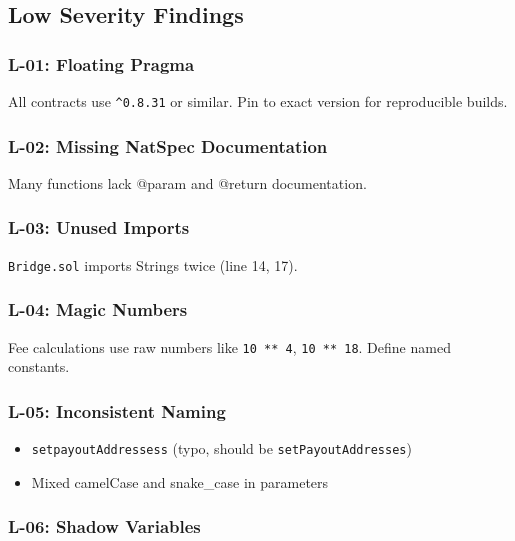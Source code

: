 \documentclass[
]{article}
\providecommand{\tightlist}{%
  \setlength{\itemsep}{0pt}\setlength{\parskip}{0pt}}
\begin{document}
\subsection{Low Severity Findings}\label{low-severity-findings}

\subsubsection{L-01: Floating Pragma}\label{l-01-floating-pragma}

All contracts use \texttt{\^{}0.8.31} or similar. Pin to exact version
for reproducible builds.

\subsubsection{L-02: Missing NatSpec
Documentation}\label{l-02-missing-natspec-documentation}

Many functions lack @param and @return documentation.

\subsubsection{L-03: Unused Imports}\label{l-03-unused-imports}

\texttt{Bridge.sol} imports Strings twice (line 14, 17).

\subsubsection{L-04: Magic Numbers}\label{l-04-magic-numbers}

Fee calculations use raw numbers like \texttt{10\ **\ 4},
\texttt{10\ **\ 18}. Define named constants.

\subsubsection{L-05: Inconsistent
Naming}\label{l-05-inconsistent-naming}

\begin{itemize}
\tightlist
\item
  \texttt{setpayoutAddressess} (typo, should be
  \texttt{setPayoutAddresses})
\item
  Mixed camelCase and snake\_case in parameters
\end{itemize}

\subsubsection{L-06: Shadow Variables}\label{l-06-shadow-variables}
\end{document}
